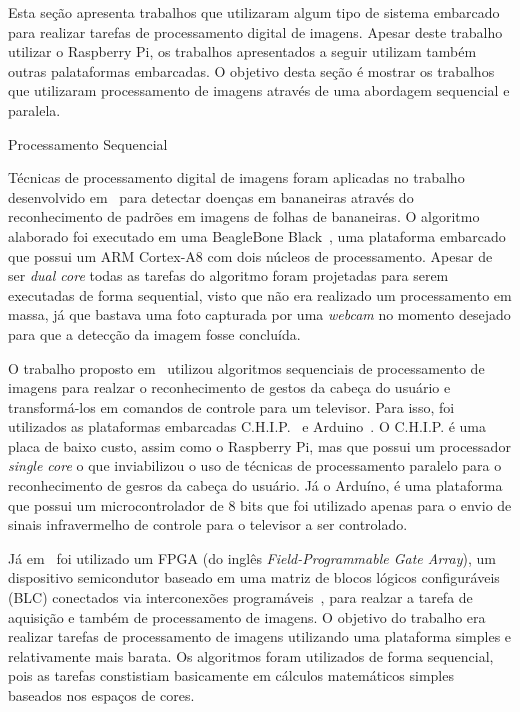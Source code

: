 Esta seção apresenta trabalhos que utilizaram algum tipo de sistema embarcado
para realizar tarefas de processamento digital de imagens. Apesar deste trabalho
utilizar o Raspberry Pi, os trabalhos apresentados a seguir utilizam também
outras palataformas embarcadas. O objetivo desta seção é mostrar os trabalhos
que utilizaram processamento de imagens através de uma abordagem sequencial e
paralela.

\begin{subsection}{Processamento Sequencial}

Técnicas de processamento digital de imagens foram aplicadas no trabalho
desenvolvido em~\cite{Karthik16} para detectar doenças em bananeiras através do
reconhecimento de padrões em imagens de folhas de bananeiras. O algoritmo
alaborado foi executado em uma BeagleBone Black~\cite{beagle}, uma plataforma
embarcado que possui um ARM Cortex-A8 com dois núcleos de processamento. Apesar
de ser \textit{dual core} todas as tarefas do algoritmo foram projetadas para
serem executadas de forma sequential, visto que não era realizado um processamento
em massa, já que bastava uma foto capturada por uma \textit{webcam} no momento 
desejado para que a detecção da imagem fosse concluída.

O trabalho proposto em~\cite{Batista17} utilizou algoritmos sequenciais de
processamento de imagens para realzar o reconhecimento de gestos da cabeça do
usuário e transformá-los em comandos de controle para um televisor. Para isso,
foi utilizados as plataformas embarcadas C.H.I.P.~\cite{chip} e
Arduino~\cite{Arduino}. O C.H.I.P. é uma placa de baixo custo, assim como o
Raspberry Pi, mas que possui um processador \textit{single core} o que
inviabilizou o uso de técnicas de processamento paralelo para o reconhecimento
de gesros da cabeça do usuário. Já o Arduíno, é uma plataforma que possui um
microcontrolador de 8 bits que foi utilizado apenas para o envio de sinais
infravermelho de controle para o televisor a ser controlado. 

Já em~\cite{Li09} foi utilizado um FPGA (do inglês \textit{Field-Programmable
Gate Array}), um dispositivo semicondutor baseado em uma matriz de blocos
lógicos configuráveis (BLC) conectados via interconexões
programáveis~\cite{fpga}, para realzar a tarefa de aquisição e também de
processamento de imagens. O objetivo do trabalho era realizar tarefas de
processamento de imagens utilizando uma plataforma simples e relativamente mais
barata. Os algoritmos foram utilizados de forma sequencial, pois as tarefas 
constistiam basicamente em cálculos matemáticos simples baseados nos espaços 
de cores.  


\end{subsection}



